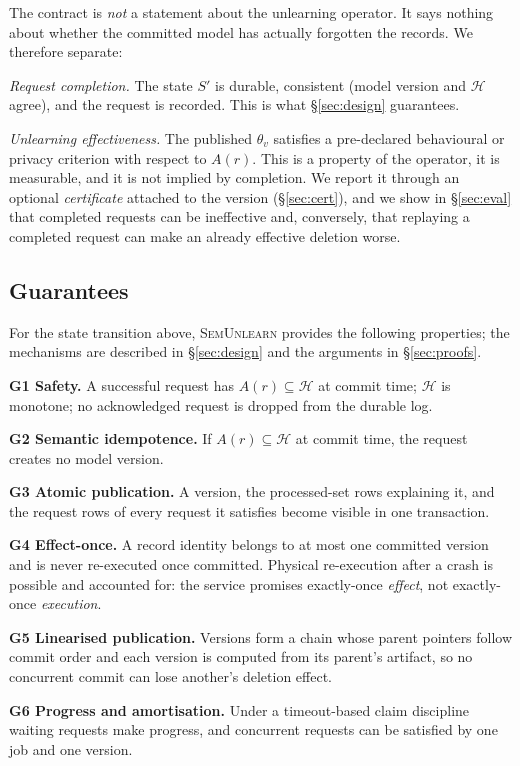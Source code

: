 \documentclass[conference]{IEEEtran}
\newcommand{\sys}{\textsc{SemUnlearn}}
\newcommand{\Hset}{\mathcal{H}}
\begin{document}
The contract is \emph{not} a statement about the unlearning operator.  It says
nothing about whether the committed model has actually forgotten the records.  We
therefore separate:

\emph{Request completion.} The state $S'$ is durable, consistent (model version and
$\Hset$ agree), and the request is recorded.  This is what \S\ref{sec:design}
guarantees.

\emph{Unlearning effectiveness.} The published $\theta_{v}$ satisfies a
pre-declared behavioural or privacy criterion with respect to $A(r)$.  This is a
property of the operator, it is measurable, and it is not implied by completion.  We
report it through an optional \emph{certificate} attached to the version
(\S\ref{sec:cert}), and we show in \S\ref{sec:eval} that completed requests can be
ineffective and, conversely, that replaying a completed request can make an already
effective deletion worse.

\subsection{Guarantees}

For the state transition above, \sys{} provides the following properties; the
mechanisms are described in \S\ref{sec:design} and the arguments in
\S\ref{sec:proofs}.

\noindent\textbf{G1 Safety.} A successful request has $A(r)\subseteq\Hset$ at commit
time; $\Hset$ is monotone; no acknowledged request is dropped from the durable log.

\noindent\textbf{G2 Semantic idempotence.} If $A(r)\subseteq\Hset$ at commit time, the
request creates no model version.

\noindent\textbf{G3 Atomic publication.} A version, the processed-set rows explaining it,
and the request rows of every request it satisfies become visible in one transaction.

\noindent\textbf{G4 Effect-once.} A record identity belongs to at most one committed
version and is never re-executed once committed.  Physical re-execution after a crash is
possible and accounted for: the service promises exactly-once \emph{effect}, not
exactly-once \emph{execution}.

\noindent\textbf{G5 Linearised publication.} Versions form a chain whose parent pointers
follow commit order and each version is computed from its parent's artifact, so no
concurrent commit can lose another's deletion effect.

\noindent\textbf{G6 Progress and amortisation.} Under a timeout-based claim discipline
waiting requests make progress, and concurrent requests can be satisfied by one job and
one version.
\end{document}
